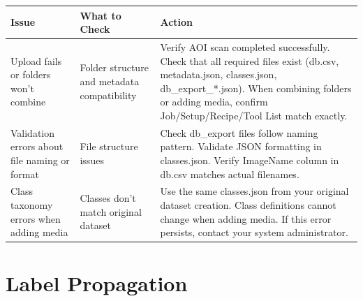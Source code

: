 \documentclass[
  11pt,
  a4paper,
  11pt,
  oneside]{report}
\renewcommand{\toprule}{\hline}
\renewcommand{\midrule}{\hline}
\renewcommand{\bottomrule}{\hline}
\begin{document}
\begin{longtable}[]{@{}
  >{\raggedright\arraybackslash}p{}
  >{\raggedright\arraybackslash}p{}
  >{\raggedright\arraybackslash}p{}@{}}
\toprule\noalign{}
\begin{minipage}[b]{\linewidth}\raggedright
\textbf{Issue}
\end{minipage} & \begin{minipage}[b]{\linewidth}\raggedright
\textbf{What to Check}
\end{minipage} & \begin{minipage}[b]{\linewidth}\raggedright
\textbf{Action}
\end{minipage} \\
\midrule\noalign{}
\endhead
\bottomrule\noalign{}
\endlastfoot
Upload fails or folders won't combine & Folder structure and metadata
compatibility & Verify AOI scan completed successfully. Check that all
required files exist (db.csv, metadata.json, classes.json,
db\_export\_*.json). When combining folders or adding media, confirm
Job/Setup/Recipe/Tool List match exactly. \\
Validation errors about file naming or format & File structure issues &
Check db\_export files follow naming pattern. Validate JSON formatting
in classes.json. Verify ImageName column in db.csv matches actual
filenames. \\
Class taxonomy errors when adding media & Classes don't match original
dataset & Use the same classes.json from your original dataset creation.
Class definitions cannot change when adding media. If this error
persists, contact your system administrator. \\
\end{longtable}

\section{Label Propagation}\label{label-propagation}
\end{document}
